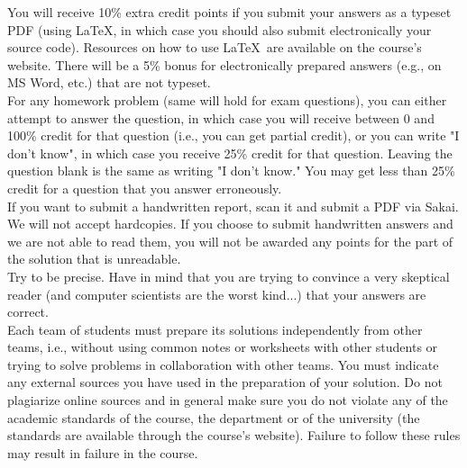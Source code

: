 \documentclass{article}
\begin{document}
 You will receive 10\% extra
credit points if you submit your answers as a typeset PDF (using
\LaTeX, in which case you should also submit electronically your
source code). Resources on how to use \LaTeX\ are available on the
course's website. There will be a 5\% bonus for electronically
prepared answers (e.g., on MS Word, etc.) that are not typeset.\\

 For any homework problem (same will hold
for exam questions), you can either attempt to answer the question, in
which case you will receive between 0 and 100\% credit for that
question (i.e., you can get partial credit), or you can write "I don't
know", in which case you receive 25\% credit for that question.
Leaving the question blank is the same as writing "I don't know." You
may get less than 25\% credit for a question that you answer
erroneously.\\

 If you want to submit a
handwritten report, scan it and submit a PDF via Sakai. We will not
accept hardcopies. If you choose to submit handwritten answers and we
are not able to read them, you will not be awarded any points for the
part of the solution that is unreadable.\\

 Try to be precise. Have in mind that you
are trying to convince a very skeptical reader (and computer
scientists are the worst kind...) that your answers are correct.\\

 Each team of students
must prepare its solutions independently from other teams, i.e.,
without using common notes or worksheets with other students or trying
to solve problems in collaboration with other teams.  You must
indicate any external sources you have used in the preparation of your
solution. Do not plagiarize online sources and in general make sure
you do not violate any of the academic standards of the course, the
department or of the university (the standards are available through
the course's website). Failure to follow these rules may result in
failure in the course.\\

\newpage

\vspace{0.1in}

{\bf }
\end{document}
